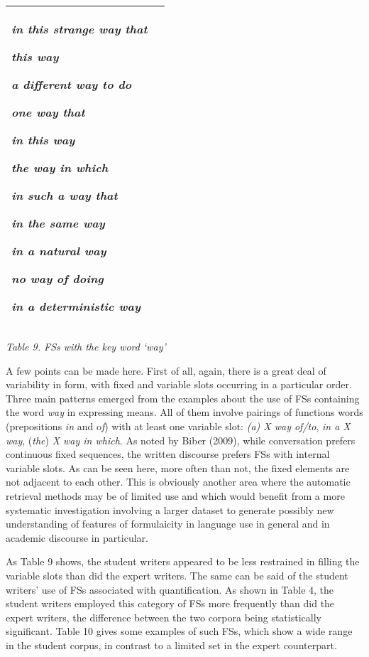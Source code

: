 \begin{center}
\begin{supertabular}{m{2.2726598in}m{2.2893598in}}
\textit{in this strange way that}

\textit{this way}

\textit{a different way to do}

\textit{one way that}

\textit{in this way}

\textit{the way in which}

\textit{in such a way that}

\textit{in the same way}

\textit{in a natural way}

\textit{no way of doing}

\textit{in a deterministic way}

\\\hline
\end{supertabular}
\end{center}
\begin{styleStandard}
\textit{Table 9. FSs with the key word ‘way’}
\end{styleStandard}

\begin{styleStandard}
A few points can be made here. First of all, again, there is a great deal of variability in form, with fixed and variable slots occurring in a particular order. Three main patterns emerged from the examples about the use of FSs containing the word \textit{way} in expressing means. All of them involve pairings of functions words (prepositions \textit{in }and o\textit{f}) with at least one variable slot: \textit{(a) X way of/to}, \textit{in a X way}, (\textit{the}) \textit{X way in which}. As noted by Biber (2009), while conversation prefers continuous fixed sequences, the written discourse prefers FSs with internal variable slots. As can be seen here, more often than not, the fixed elements are not adjacent to each other. This is obviously another area where the automatic retrieval methods may be of limited use and which would benefit from a more systematic investigation involving a larger dataset to generate possibly new understanding of features of formulaicity in language use in general and in academic discourse in particular. 
\end{styleStandard}

\begin{styleStandard}
As Table 9 shows, the student writers appeared to be less restrained in filling the variable slots than did the expert writers. The same can be said of the student writers’ use of FSs associated with quantification. As shown in Table 4, the student writers employed this category of FSs more frequently than did the expert writers, the difference between the two corpora being statistically significant. Table 10 gives some examples of such FSs, which show a wide range in the student corpus, in contrast to a limited set in the expert counterpart. 
\end{styleStandard}

